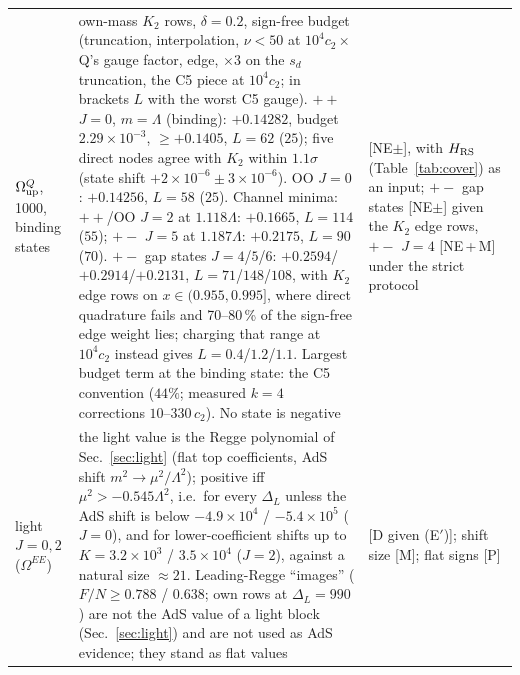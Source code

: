 \documentclass[aps,prl,onecolumn,superscriptaddress,nofootinbib]{revtex4-2}
\begin{document}
\begin{table}[!htbp]
\begin{ruledtabular}
\begin{tabular}{L{3.0cm}L{10.8cm}L{2.4cm}}
$\Omega^Q_{\rm up}$, 1000, binding states & own-mass $K_2$ rows, $\delta=0.2$, sign-free budget (truncation, interpolation, $\nu<50$ at $10^4c_2\times$ Q's gauge factor, edge, $\times3$ on the $s_d$ truncation, the C5 piece at $10^4c_2$; in brackets $L$ with the worst C5 gauge). $++$ $J=0$, $m=\Lambda$ (binding): $+0.14282$, budget $2.29\times10^{-3}$, $\ge+0.1405$, $L=62$ ($25$); five direct nodes agree with $K_2$ within $1.1\sigma$ (state shift $+2\times10^{-6}\pm3\times10^{-6}$). OO $J=0$: $+0.14256$, $L=58$ ($25$). Channel minima: $++$/OO $J=2$ at $1.118\Lambda$: $+0.1665$, $L=114$ ($55$); $+-$ $J=5$ at $1.187\Lambda$: $+0.2175$, $L=90$ ($70$). $+-$ gap states $J=4$/$5$/$6$: $+0.2594$/$+0.2914$/$+0.2131$, $L=71$/$148$/$108$, with $K_2$ edge rows on $x\in(0.955,0.995]$, where direct quadrature fails and 70--80\,\% of the sign-free edge weight lies; charging that range at $10^4c_2$ instead gives $L=0.4$/$1.2$/$1.1$. Largest budget term at the binding state: the C5 convention ($44\%$; measured $k=4$ corrections $10$--$330\,c_2$). No state is negative & [NE$\pm$], with $H_{\rm RS}$ (Table~\ref{tab:cover}) as an input; $+-$ gap states [NE$\pm$] given the $K_2$ edge rows, $+-$ $J=4$ [NE\,+\,M] under the strict protocol\\
light $J=0,2$ ($\Omega^{EE}$) & the light value is the Regge polynomial of Sec.~\ref{sec:light} (flat top coefficients, AdS shift $m^2\to\mu^2/\Lambda^2$); positive iff $\mu^2>-0.545\Lambda^2$, i.e.\ for every $\Delta_L$ unless the AdS shift is below $-4.9\times10^4$ / $-5.4\times10^5$ ($J=0$), and for lower-coefficient shifts up to $K=3.2\times10^3$ / $3.5\times10^4$ ($J=2$), against a natural size $\approx21$. Leading-Regge ``images'' ($F/N\ge0.788$ / $0.638$; own rows at $\Delta_L=990$) are not the AdS value of a light block (Sec.~\ref{sec:light}) and are not used as AdS evidence; they stand as flat values & [D given (E$'$)]; shift size [M]; flat signs [P]\\
\end{tabular}
\end{ruledtabular}
\end{table}
\end{document}

